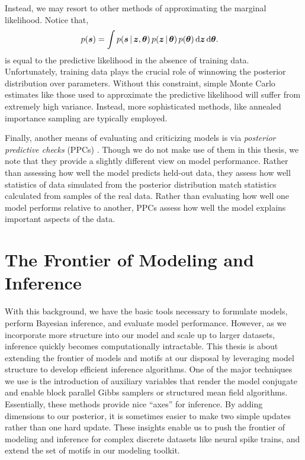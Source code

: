 Instead, we may resort to other methods of approximating the marginal
likelihood. Notice that,
\begin{align}
  \label{eq:marginal_likelihood}
  p(\boldsymbol{s})
  &= \int p(\boldsymbol{s} \,|\, \boldsymbol{z}, \boldsymbol{\theta}) \,
  p(\boldsymbol{z} \,|\, \boldsymbol{\theta}) \,
  p(\boldsymbol{\theta}) \,
  \mathrm{d}\boldsymbol{z} \, \mathrm{d} \boldsymbol{\theta}.
\end{align}
is equal to the predictive likelihood
in the absence of training data. Unfortunately, training data plays the crucial
role of winnowing the posterior distribution over parameters. Without this constraint, simple Monte Carlo estimates
like those used to approximate the predictive likelihood will suffer from
extremely high variance. Instead, more sophisticated methods, like annealed
importance sampling \citep{neal2001annealed} are typically employed. 

Finally, another means of evaluating and criticizing models is via
\emph{posterior predictive checks} (PPCs) \citep{box1980sampling,
  Gelman13, blei2014build}.  Though we do not make use of them in this
thesis, we note that they provide a slightly different view on model
performance. Rather than assessing how well the model predicts
held-out data, they assess how well statistics of data simulated from
the posterior distribution match statistics calculated from samples of
the real data. Rather than evaluating how well one model performs
relative to another, PPCs assess how well the model explains important
aspects of the data.

\section{The Frontier of Modeling and Inference}
With this background, we have the basic tools necessary to formulate
models, perform Bayesian inference, and evaluate model performance.
However, as we incorporate more structure into our model and scale up
to larger datasets, inference quickly becomes computationally
intractable. This thesis is about extending the frontier of models and
motifs at our disposal by leveraging model structure to develop
efficient inference algorithms. One of the major techniques we use is
the introduction of auxiliary variables that render the model
conjugate and enable block parallel Gibbs samplers or structured mean
field algorithms. Essentially, these methods provide nice ``axes''
for inference. By adding dimensions to our posterior, it is sometimes
easier to make two simple updates rather than one hard update.  These
insights enable us to push the frontier of modeling and inference for
complex discrete datasets like neural spike trains, and extend the
set of motifs in our modeling toolkit.

